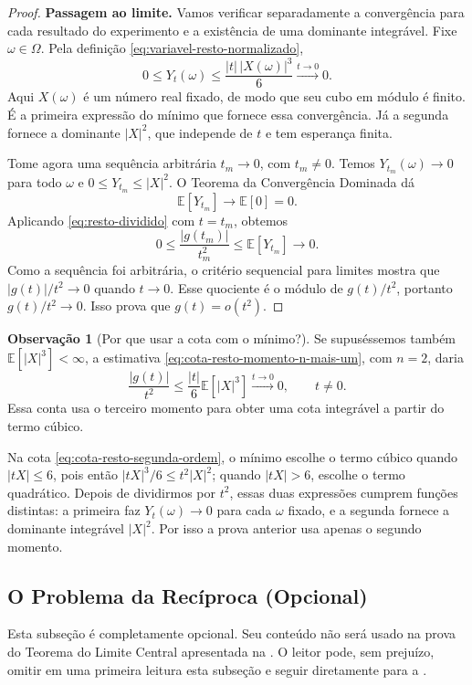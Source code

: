 \documentclass[12pt,portuguese]{article}
\theoremstyle{definition}
\newtheorem{remark}[remark]{Observação}
\theoremstyle{plainexercise}
\theoremstyle{starredexercise}
\theoremstyle{definition}
\begin{document}
\begin{proof}
\smallskip
\noindent\textbf{Passagem ao limite.}
Vamos verificar separadamente a convergência para cada resultado
do experimento e a existência de uma dominante integrável.
Fixe $\omega\in\Omega$. Pela definição
\eqref{eq:variavel-resto-normalizado},
\[
0\leqslant Y_t(\omega)
\leqslant\frac{|t|\,|X(\omega)|^3}{6}
\xrightarrow{t\to0}0.
\]
Aqui $X(\omega)$ é um número real fixado, de modo que seu cubo em
módulo é finito. É a primeira expressão do mínimo que fornece
essa convergência. Já a segunda fornece a dominante $|X|^2$,
que independe de $t$ e tem esperança finita.

Tome agora uma sequência arbitrária $t_m\to0$, com $t_m\neq0$.
Temos $Y_{t_m}(\omega)\to0$ para todo $\omega$ e
$0\leqslant Y_{t_m}\leqslant|X|^2$.
O Teorema da Convergência Dominada dá
\[
\mathbb{E}[Y_{t_m}]\longrightarrow\mathbb{E}[0]=0.
\]
Aplicando \eqref{eq:resto-dividido} com $t=t_m$, obtemos
\[
0\leqslant\frac{|g(t_m)|}{t_m^2}
\leqslant\mathbb{E}[Y_{t_m}]\longrightarrow0.
\]
Como a sequência foi arbitrária, o critério sequencial para limites
mostra que $|g(t)|/t^2\to0$ quando $t\to0$.
Esse quociente é o módulo de $g(t)/t^2$, portanto
$g(t)/t^2\to0$. Isso prova que $g(t)=o(t^2)$.
\end{proof}

\begin{remark}[Por que usar a cota com o mínimo?]\label{rem:cota-minimo}
Se supuséssemos também $\mathbb{E}[|X|^3]<\infty$, a estimativa
\eqref{eq:cota-resto-momento-n-mais-um}, com $n=2$, daria
\[
\frac{|g(t)|}{t^2}
\leqslant\frac{|t|}{6}\mathbb{E}[|X|^3]
\xrightarrow{t\to0}0,
\qquad t\neq0.
\]
Essa conta usa o terceiro momento para obter uma cota integrável
a partir do termo cúbico.

Na cota \eqref{eq:cota-resto-segunda-ordem}, o mínimo escolhe
o termo cúbico quando $|tX|\leqslant6$, pois então
$|tX|^3/6\leqslant t^2|X|^2$; quando $|tX|>6$, escolhe o termo
quadrático. Depois de dividirmos por $t^2$, essas duas expressões
cumprem funções distintas: a primeira faz
$Y_t(\omega)\to0$ para cada $\omega$ fixado, e a segunda fornece
a dominante integrável $|X|^2$. Por isso a prova anterior usa
apenas o segundo momento.
\end{remark}

\subsection{O Problema da Recíproca (Opcional)}\label{subsec:reciproca-segunda-ordem}

Esta subseção é completamente opcional. Seu conteúdo não será usado
na prova do Teorema do Limite Central apresentada na .
O leitor pode, sem prejuízo, omitir em uma primeira leitura esta subseção
e seguir diretamente para a .
\end{document}
